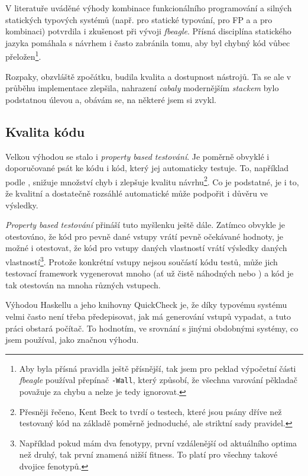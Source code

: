 V literatuře uváděné výhody kombinace funkcionálního programování a silných statických typových systémů (např. \citet{meijer2004static} pro
statické typování, \citet{hughes1989functional} pro FP a \citet{Chiusano2016} a \citet{ray2014large} pro kombinaci)
potvrdila i zkušenost při vývoji
\textit{fbeagle}. Přísná disciplína statického jazyka pomáhala s návrhem i často zabránila tomu, aby byl chybný kód vůbec přeložen\footnote{
Aby byla přísná pravidla ještě přísnější, tak jsem pro peklad výpočetní části \textit{fbeagle} používal přepínač \texttt{-Wall}, který způsobí,
že všechna varování pěkladač považuje za chybu a nelze je tedy ignorovat.
}.

Rozpaky, obzvláště zpočátku, budila kvalita a dostupnost nástrojů. Ta se ale v průběhu implementace zlepšila, nahrazení \textit{cabaly} modernějším
\textit{stackem} bylo podstatnou úlevou a, obávám se, na některé  jsem si zvykl.

\subsection{Kvalita kódu}

Velkou výhodou se stalo i \textit{property based testování}. Je poměrně obvyklé i doporučované \citep{williams2009effectiveness} psát ke kódu i kód, který jej
automaticky testuje. To, například podle \citet{beck2003test}, snižuje množství chyb i zlepšuje kvalitu návrhu\footnote{
Přesněji řečeno, Kent Beck to tvrdí o testech, které jsou psány dříve než testovaný kód na základě poměrně jednoduché, ale striktní sady pravidel.
}. Co je podstatné, je i to,
že kvalitní a dostatečně rozsáhlé automatické může podpořit i důvěru ve výsledky.

\textit{Property based testování} přináší tuto myšlenku ještě dále. Zatímco obvykle je otestováno, že kód pro pevně dané vstupy vrátí pevně
očekávané hodnoty, je možné i otestovat, že kód pro vstupy daných vlastností vrátí výsledky daných vlastností\footnote{
Například pokud mám dva fenotypy, první vzdálenější od aktuálního optima než druhý, tak první znamená nižší fitness. To platí pro všechny takové
dvojice fenotypů.
}. Protože konkrétní vstupy nejsou součástí kódu testů, může jich testovací framework vygenerovat mnoho (ať už čistě náhodných nebo )
a kód je tak otestován na mnoha různých vstupech.

Výhodou Haskellu a jeho knihovny QuickCheck \citep{Claessen:2000:QLT:351240.351266} je, že díky typovému systému velmi často není třeba předepisovat, jak má generování vstupů vypadat, a tuto práci obstará počítač. To hodnotím, ve srovnání s jinými obdobnými systémy, co jsem používal, jako značnou výhodu.


